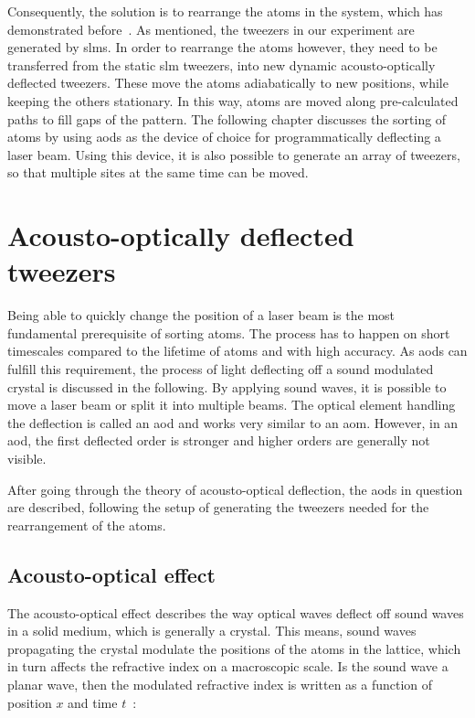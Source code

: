 Consequently, the solution is to rearrange the atoms in the system, which has demonstrated before~\cite{Lee2016, Barredo2016, Endres2016, Barredo2018}. As mentioned, the tweezers in our experiment are generated by \acp{slm}. In order to rearrange the atoms however, they need to be transferred from the static \ac{slm} tweezers, into new dynamic acousto-optically deflected tweezers. These move the atoms adiabatically to new positions, while keeping the others stationary. In this way, atoms are moved along pre-calculated paths to fill gaps of the pattern. The following chapter discusses the sorting of atoms by using \acfp{aod} as the device of choice for programmatically deflecting a laser beam. Using this device, it is also possible to generate an array of tweezers, so that multiple sites at the same time can be moved.


\section{Acousto-optically deflected tweezers}

Being able to quickly change the position of a laser beam is the most fundamental prerequisite of sorting atoms. The process has to happen on short timescales compared to the lifetime of atoms and with high accuracy. As \acp{aod} can fulfill this requirement, the process of light deflecting off a sound modulated crystal is discussed in the following. By applying sound waves, it is possible to move a laser beam or split it into multiple beams. The optical element handling the deflection is called an \ac{aod} and works very similar to an \ac{aom}. However, in an \ac{aod}, the first deflected order is stronger and higher orders are generally not visible.

After going through the theory of acousto-optical deflection, the \acp{aod} in question are described, following the setup of generating the tweezers needed for the rearrangement of the atoms.

\subsection{Acousto-optical effect}

The acousto-optical effect describes the way optical waves deflect off sound waves in a solid medium, which is generally a crystal. This means, sound waves propagating the crystal modulate the positions of the atoms in the lattice, which in turn affects the refractive index on a macroscopic scale. Is the sound wave a planar wave, then the modulated refractive index is written as a function of position $x$ and time $t$~\cite{Saleh1991}:

